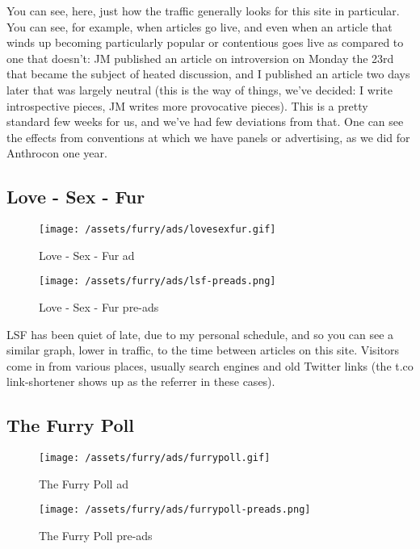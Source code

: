 You can see, here, just how the traffic generally looks for this site in
particular. You can see, for example, when articles go live, and even
when an article that winds up becoming particularly popular or
contentious goes live as compared to one that doesn't: JM published an
article on introversion on Monday the 23rd that became the subject of
heated discussion, and I published an article two days later that was
largely neutral (this is the way of things, we've decided: I write
introspective pieces, JM writes more provocative pieces). This is a
pretty standard few weeks for us, and we've had few deviations from
that. One can see the effects from conventions at which we have panels
or advertising, as we did for Anthrocon one year.

\subsection{Love - Sex - Fur}\label{love---sex---fur}

\begin{figure}[htbp]
\centering
\texttt{[image: /assets/furry/ads/lovesexfur.gif]}
\caption{Love - Sex - Fur ad}
\end{figure}

\begin{figure}[htbp]
\centering
\texttt{[image: /assets/furry/ads/lsf-preads.png]}
\caption{Love - Sex - Fur pre-ads}
\end{figure}

LSF has been quiet of late, due to my personal schedule, and so you can
see a similar graph, lower in traffic, to the time between articles on
this site. Visitors come in from various places, usually search engines
and old Twitter links (the t.co link-shortener shows up as the referrer
in these cases).

\subsection{The Furry Poll}\label{the-furry-poll}

\begin{figure}[htbp]
\centering
\texttt{[image: /assets/furry/ads/furrypoll.gif]}
\caption{The Furry Poll ad}
\end{figure}

\begin{figure}[htbp]
\centering
\texttt{[image: /assets/furry/ads/furrypoll-preads.png]}
\caption{The Furry Poll pre-ads}
\end{figure}

